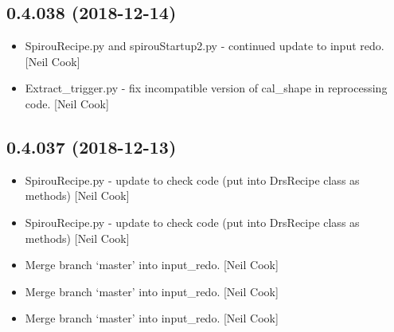 \documentclass[a4paper,10pt,english]{report}
\begin{document}
\subsection{0.4.038 (2018-12-14)}
\label{\detokenize{misc/changelog:id232}}\begin{itemize}
\item {} 
SpirouRecipe.py and spirouStartup2.py - continued update to input
redo. {[}Neil Cook{]}

\item {} 
Extract\_trigger.py - fix incompatible version of cal\_shape in
reprocessing code. {[}Neil Cook{]}

\end{itemize}


\subsection{0.4.037 (2018-12-13)}
\label{\detokenize{misc/changelog:id233}}\begin{itemize}
\item {} 
SpirouRecipe.py - update to check code (put into DrsRecipe class as
methods) {[}Neil Cook{]}

\item {} 
SpirouRecipe.py - update to check code (put into DrsRecipe class as
methods) {[}Neil Cook{]}

\item {} 
Merge branch ‘master’ into input\_redo. {[}Neil Cook{]}

\item {} 
Merge branch ‘master’ into input\_redo. {[}Neil Cook{]}

\item {} 
Merge branch ‘master’ into input\_redo. {[}Neil Cook{]}

\end{itemize}
\end{document}
